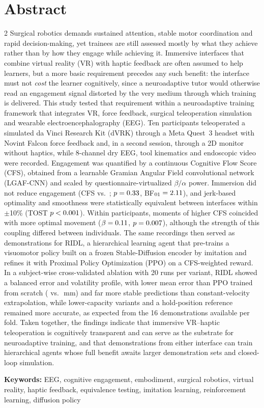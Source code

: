 \documentclass[utf8]{frontiers_suppmat}
\providecommand{\keywords}[1]{\par\medskip\noindent\textbf{Keywords:} #1}
\begin{document}
\section*{Abstract}
\begin{multicols}{2}
Surgical robotics demands sustained attention, stable motor coordination and rapid decision-making, yet trainees are still assessed mostly by what they achieve rather than by how they engage while achieving it. Immersive interfaces that combine virtual reality (VR) with haptic feedback are often assumed to help learners, but a more basic requirement precedes any such benefit: the interface must not \emph{cost} the learner cognitively, since a neuroadaptive tutor would otherwise read an engagement signal distorted by the very medium through which training is delivered. This study tested that requirement within a neuroadaptive training framework that integrates VR, force feedback, surgical teleoperation simulation and wearable electroencephalography (EEG). Ten participants teleoperated a simulated da Vinci Research Kit (dVRK) through a Meta Quest~3 headset with Novint Falcon force feedback and, in a second session, through a 2D monitor without haptics, while 8-channel dry EEG, tool kinematics and endoscopic video were recorded. Engagement was quantified by a continuous Cognitive Flow Score (CFS), obtained from a learnable Gramian Angular Field convolutional network (LGAF-CNN) and scaled by questionnaire-virtualized $\beta/\alpha$ power. Immersion did not reduce engagement (CFS \hCfsVR{} vs.\ \hCfsNVR{}; $p=0.33$, BF$_{01}=2.11$), and jerk-based optimality and smoothness were statistically equivalent between interfaces within $\pm$10\% (TOST $p<0.001$). Within participants, moments of higher CFS coincided with more optimal movement ($\beta=0.11$, $p=0.007$), although the strength of this coupling differed between individuals. The same recordings then served as demonstrations for RIDL, a hierarchical learning agent that pre-trains a visuomotor policy built on a frozen Stable-Diffusion encoder by imitation and refines it with Proximal Policy Optimization (PPO) on a CFS-weighted reward. In a subject-wise cross-validated ablation with 20 runs per variant, RIDL showed a balanced error and volatility profile, with lower mean error than PPO trained from scratch (\aRidlErr{} vs.\ \aPpoErr{}\,mm) and far more stable predictions than constant-velocity extrapolation, while lower-capacity variants and a hold-position reference remained more accurate, as expected from the 16 demonstrations available per fold. Taken together, the findings indicate that immersive VR--haptic teleoperation is cognitively transparent and can serve as the substrate for neuroadaptive training, and that demonstrations from either interface can train hierarchical agents whose full benefit awaits larger demonstration sets and closed-loop simulation.

\keywords{EEG, cognitive engagement, embodiment, surgical robotics, virtual reality, haptic feedback, equivalence testing, imitation learning, reinforcement learning, diffusion policy}
\end{multicols}
\end{document}
